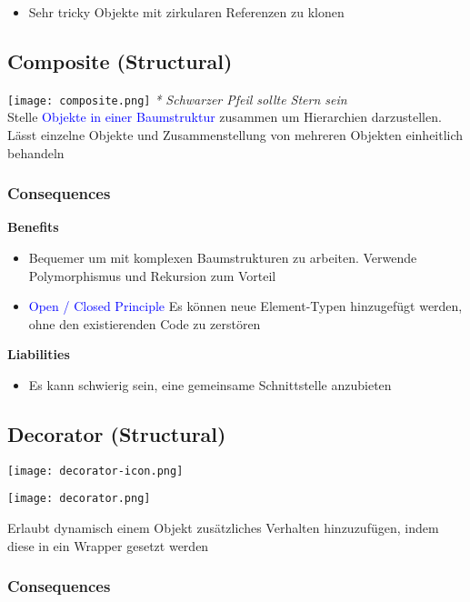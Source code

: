 \begin{itemize}
    \item Sehr tricky Objekte mit zirkularen Referenzen zu klonen
\end{itemize}

\subsection{Composite (Structural)}

\texttt{[image: composite.png]}
\textit{* Schwarzer Pfeil sollte Stern sein} \\

Stelle \textcolor{blue}{Objekte in einer Baumstruktur} zusammen um Hierarchien darzustellen. Lässt einzelne Objekte und Zusammenstellung von mehreren Objekten einheitlich behandeln

\subsubsection{Consequences}

\textbf{Benefits}
\begin{itemize}
    \item Bequemer um mit komplexen Baumstrukturen zu arbeiten. Verwende Polymorphismus und Rekursion zum Vorteil
    \item \textcolor{blue}{Open / Closed Principle} Es können neue Element-Typen hinzugefügt werden, ohne den existierenden Code zu zerstören
\end{itemize}
\vspace{10pt}
\textbf{Liabilities}

\begin{itemize}
    \item Es kann schwierig sein, eine gemeinsame Schnittstelle anzubieten
\end{itemize}

\subsection{Decorator (Structural)}

\texttt{[image: decorator-icon.png]}

\texttt{[image: decorator.png]}

Erlaubt dynamisch einem Objekt zusätzliches Verhalten hinzuzufügen, indem diese in ein Wrapper gesetzt
werden

\subsubsection{Consequences}

